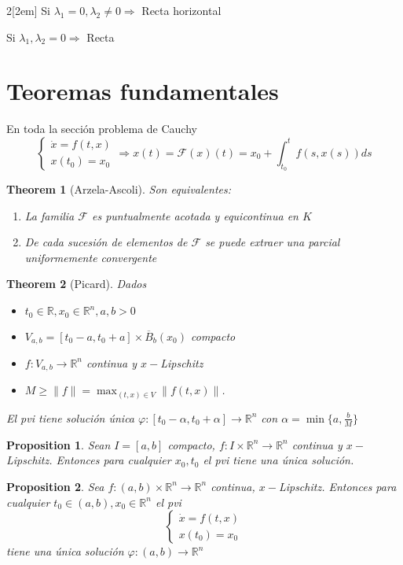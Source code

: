 \documentclass{myclass}
\newtheorem*{theorem}{Theorem}
\newtheorem*{proposition}{Proposition}
\begin{document}
\begin{multicols}{2}[\columnsep2em]
Si $\lambda_1 = 0, \lambda_2 \neq 0 \Rightarrow$ Recta horizontal
	
Si $\lambda_1, \lambda_2 = 0\Rightarrow $ Recta 

\section{Teoremas fundamentales}
En toda la sección problema de Cauchy
\[
\begin{cases}
  \dot{x}=f(t, x)\\
  x(t_0) = x_0
\end{cases} \Rightarrow
x(t) = \mathcal{F}(x)(t)= x_0 + \int_{t_0}^t f(s, x(s))ds
\] 

\begin{theorem}[Arzela-Ascoli] Son equivalentes:
\begin{enumerate}[topsep=-6pt, itemsep=0pt]
  \item La familia $\mathcal{F}$ es puntualmente acotada y equicontinua en $K$
  \item De cada sucesión de elementos de $\mathcal{F}$ se puede extraer una parcial uniformemente convergente
\end{enumerate}
\end{theorem}

\begin{theorem}[Picard] Dados 
\begin{itemize}[topsep=-6pt, itemsep=0pt]
  \item $t_0\in \mathbb{R}, x_0 \in \mathbb{R}^n, a, b>0$
  \item $V_{a, b}=[t_0-a, t_0+a]\times \overline{B}_b(x_0)$ compacto
  \item $f:V_{a, b} \to  \mathbb{R}^n$ continua y $x-$Lipschitz
  \item $M\ge \|f\|=\max_{(t,x)\in V}\|f(t,x)\|$.
\end{itemize}
El pvi tiene solución única $\varphi : [t_0-\alpha , t_0+\alpha ] \to  \mathbb{R}^n$ con $\alpha = \min\{a, \frac{b}{M}\}$
\end{theorem}

\begin{proposition}
Sean  $I = [a,b]$ compacto, $f: I\times \mathbb{R}^n \to \mathbb{R}^n$ continua y $x-$Lipschitz. Entonces para cualquier $x_0, t_0$ el pvi tiene una única solución.
\end{proposition}

\begin{proposition}
Sea $f:(a,b)\times \mathbb{R}^n\to \mathbb{R}^n$ continua, $x-$Lipschitz. Entonces para cualquier  $t_0\in (a,b), x_0\in \mathbb{R}^n$ el pvi
\[
  \begin{cases}
\dot{x}=f(t,x)\\
x(t_0)=x_0
  \end{cases}
\] 
tiene una única solución $\varphi :(a,b)\to \mathbb{R}^n$
\end{proposition}


\end{multicols}
\end{document}
